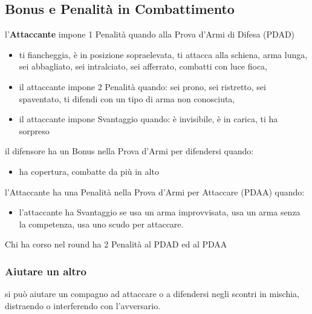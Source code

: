 \documentclass[12pt,a4paper,twoside,openany]{book}
\begin{document}
\begin{multicols}{2}
\subsection{Bonus e Penalità in Combattimento}

l'\textbf{Attaccante} impone 1 Penalità quando alla Prova d'Armi di Difesa (PDAD)

\begin{itemize}

\item ti fiancheggia, è in posizione sopraelevata, ti attacca alla schiena, arma lunga, sei abbagliato, sei intralciato, sei afferrato, combatti con luce fioca, 

\item 
il attaccante impone 2 Penalità quando:
\subitem sei prono, sei ristretto, sei spaventato, ti difendi con un tipo di arma non conosciuta, 

\item 
il attaccante impone Svantaggio quando:
\subitem è invisibile, è in carica, ti ha sorpreso

\end{itemize}

il difensore ha un Bonus nella Prova d'Armi per difendersi quando:

\begin{itemize}
	
\item 
ha copertura, combatte da più in alto

\end{itemize}


l'Attaccante ha una Penalità nella Prova d'Armi per Attaccare (PDAA) quando:

\begin{itemize}

\item 
l'attaccante ha Svantaggio se usa un arma improvvisata, usa un arma senza la competenza, usa uno scudo per attaccare.
	
\end{itemize}

Chi ha corso nel round ha 2 Penalità al PDAD ed al PDAA


\subsubsection{Aiutare un altro}\label{aiutare}

si può aiutare un compagno ad attaccare o a difendersi negli scontri in mischia, distraendo o interferendo con l'avversario. 


\end{multicols}
\end{document}
